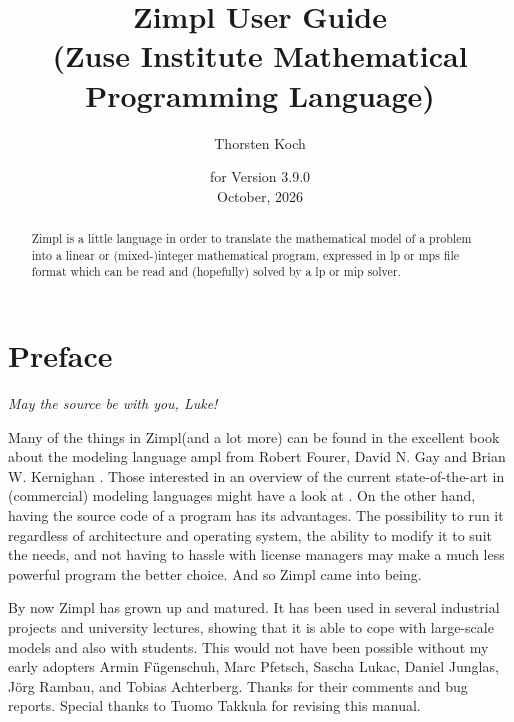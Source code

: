 \documentclass[11pt]{article}
\newcommand{\zimpl}{{\sc Zimpl}\xspace}
\newcommand{\lp}{{\sc lp}\xspace}
\newcommand{\mip}{{\sc mip}\xspace}
\newcommand{\mps}{{\sc mps}\xspace}
\newcommand{\lpf}{{\sc lp}\xspace}
\newcommand{\ampl}{{\sc ampl}\xspace}
\begin{document}

\title{
\LARGE\zimpl User Guide\\
\normalsize (Zuse Institute Mathematical Programming Language)}
\author{Thorsten Koch}
\date{\small for Version 3.9.0\\October, 2026}
\maketitle
%
\tableofcontents
\newpage
\begin{abstract}
  \zimpl is a little language in order to translate the mathematical
  model of a problem into a linear or (mixed-)integer mathematical
  program, expressed in \lpf or \mps file format which can be read and
  (hopefully) solved by a \lp or \mip solver.
\end{abstract}


\section{Preface}
\begin{flushright}
{\em May the source be with you, Luke!}
\end{flushright}
Many of the things in \zimpl (and a lot more) can be found in
the excellent book about the modeling language \ampl
from Robert Fourer, David N. Gay and Brian W. Kernighan
\cite{FourierGayKernighan2003}. Those interested in an overview of the
current state-of-the-art in (commercial) modeling languages might have
a look at \cite{Kallrath2004}.
%
On the other hand, having the source code of a program has its
advantages. The possibility to run it regardless of architecture and
operating system, the ability to modify it to suit the needs, and not
having to hassle with license managers may make a much less powerful
program the better choice.  And so \zimpl came into being.

\bigskip
By now \zimpl has grown up and matured. It has been used in several
industrial projects and university lectures, showing that it is able to
cope with large-scale models and also with students.
This would not have been possible without my early adopters
Armin F\"ugenschuh, Marc Pfetsch, Sascha Lukac, Daniel Junglas, J\"org
Rambau, and Tobias Achterberg. Thanks for their comments and bug
reports. Special thanks to Tuomo Takkula for revising this manual.
\end{document}
